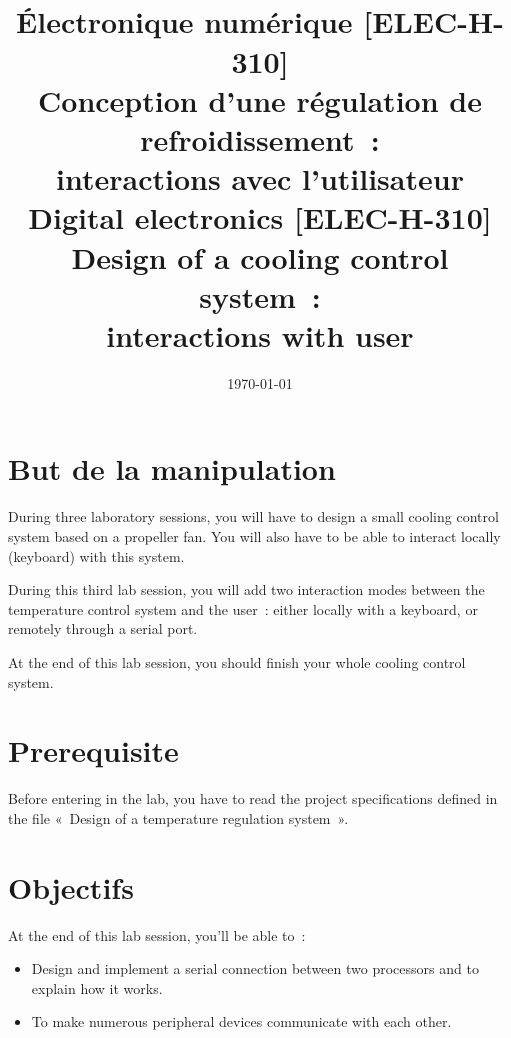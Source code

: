 \documentclass[11pt,a4paper]{article}
\date{\vspace{-1.7cm}\mydate\today}
\title{\vspace{-2cm}\labonumber\\ Électronique numérique [ELEC-H-310]\\Conception d'une régulation de refroidissement~: \\ interactions avec l'utilisateur\ifthenelse{\boolean{corrige}}{~\\Corrigé}{}}
\title{\vspace{-2cm}\labonumber \\ Digital electronics [ELEC-H-310]\\Design of a cooling control system~: \\ interactions with user\ifthenelse{\boolean{corrige}}{~\\Corrigé}{}}
\theoremstyle{definition}%
\begin{document}
\pagestyle{empty}
\maketitle





\section*{But de la manipulation}
During three laboratory sessions, you will have to design a small cooling control system based on a propeller fan.
You will also have to be able to interact locally (keyboard) with this system.

During this third lab session, you will add two interaction modes between the temperature control system and the user~: either locally with a keyboard, or remotely through a serial port.

At the end of this lab session, you should finish your whole cooling control system.


\section*{Prerequisite}
Before entering in the lab, you have to read the project specifications defined in the file «~Design of a temperature regulation system~».



\section*{Objectifs}
At the end of this lab session, you'll be able to~:
\begin{itemize}
	\item Design and implement a serial connection between two processors and to explain how it works.
	\item To make numerous peripheral devices communicate with each other.
\end{itemize}


\newpage





\end{document}
